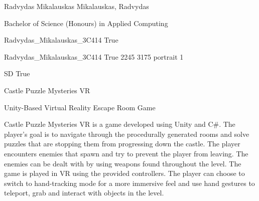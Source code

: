 
\begingroup{}\relax



\def\Key{Radvydas_Mikalauskas_3C414}

{Radvydas Mikalauskas}
{Mikalauskas, Radvydas}

{Bachelor of Science (Honours) in Applied Computing}

{Radvydas_Mikalauskas_3C414}
{True}

{Radvydas_Mikalauskas_3C414}
{True}
{2245}
{3175}
{portrait}
{1}

{SD}
{True}

{Castle Puzzle Mysteries VR}

{Unity-Based Virtual Reality Escape Room Game}

{Castle Puzzle Mysteries VR is a game developed using Unity and C\#. The player's goal is to navigate through the procedurally generated rooms and solve puzzles that are stopping them from progressing down the castle. The player encounters enemies that spawn and try to prevent the player from leaving. The enemies can be dealt with by using weapons found throughout the level. The game is played in VR using the provided controllers. The player can choose to switch to hand-tracking mode for a more immersive feel and use hand gestures to teleport, grab and interact with objects in the level.}

